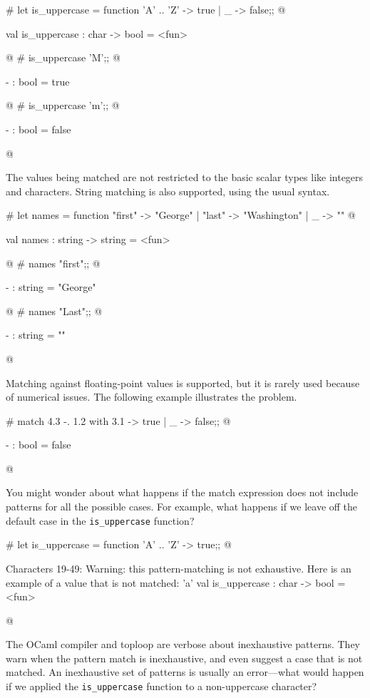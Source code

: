 \label{keyword:_}
\begin{ocaml}
# let is_uppercase = function
     'A' .. 'Z' -> true
   | _ -> false;;
@
\begin{topoutput}
val is_uppercase : char -> bool = <fun>
\end{topoutput}
@
# is_uppercase 'M';;
@
\begin{topoutput}
- : bool = true
\end{topoutput}
@
# is_uppercase 'm';;
@
\begin{topoutput}
- : bool = false
\end{topoutput}
@
\end{ocaml}
%
The values being matched are not restricted to the basic scalar types
like integers and characters.  String matching is also supported,
using the usual syntax.

\begin{ocaml}
# let names = function
     "first" -> "George"
   | "last" -> "Washington"
   | _ -> ""
@
\begin{topoutput}
val names : string -> string = <fun>
\end{topoutput}
@
# names "first";;
@
\begin{topoutput}
- : string = "George"
\end{topoutput}
@
# names "Last";;
@
\begin{topoutput}
- : string = ""
\end{topoutput}
@
\end{ocaml}
%
Matching against floating-point values is supported, but it is rarely
used because of numerical issues.  The following example illustrates
the problem.

\begin{ocaml}
# match 4.3 -. 1.2 with
     3.1 -> true
   | _ -> false;;
@
\begin{topoutput}
- : bool = false
\end{topoutput}
@
\end{ocaml}


You might wonder about what happens if the match expression does not
include patterns for all the possible cases.  For example, what
happens if we leave off the default case in the \hbox{\lstinline/is_uppercase/}
function?

\begin{ocaml}
# let is_uppercase = function
     'A' .. 'Z' -> true;;
@
\begin{toperror}
Characters 19-49:
Warning: this pattern-matching is not exhaustive.
Here is an example of a value that is not matched:
'a'
val is_uppercase : char -> bool = <fun>
\end{toperror}
@
\end{ocaml}
%
The OCaml compiler and toploop are verbose about inexhaustive
patterns.  They warn when the pattern match is inexhaustive, and even
suggest a case that is not matched.  An inexhaustive set of patterns
is usually an error---what would happen if we applied the
\hbox{\lstinline/is_uppercase/} function to a non-uppercase character?

